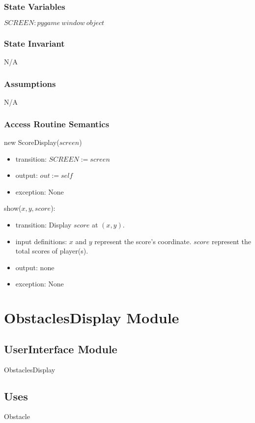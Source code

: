 \documentclass[12pt]{article}
\begin{document}
\subsubsection*{State Variables}
$SCREEN: pygame\ window\ object$
\subsubsection*{State Invariant}
N/A
\subsubsection*{Assumptions}
N/A
\subsubsection*{Access Routine Semantics}

new ScoreDisplay($screen$)
\begin{itemize}
    \item transition: $SCREEN := screen$
    \item output: $out := self$
    \item exception: None
\end{itemize}

\noindent show($x, y, score$):
\begin{itemize}
    \item transition: Display $score$ at $(x, y)$.
    \item input definitions: $x$ and $y$ represent the score's coordinate. $score$ represent the total scores of player(s).
    \item output: none
    \item exception: None
\end{itemize}
\newpage

\section{ObstaclesDisplay Module}

\subsection*{UserInterface Module}
ObstaclesDisplay

\subsection*{Uses}
Obstacle
\end{document}
